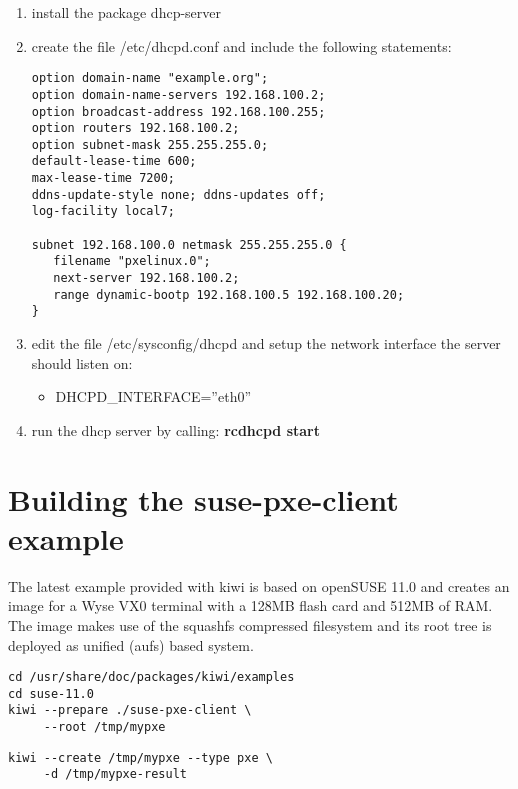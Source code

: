 \begin{enumerate}
\item install the package dhcp-server
\item create the file /etc/dhcpd.conf and include the following
      statements:
 
      \begin{verbatim}
option domain-name "example.org";
option domain-name-servers 192.168.100.2;
option broadcast-address 192.168.100.255;
option routers 192.168.100.2;
option subnet-mask 255.255.255.0;
default-lease-time 600;
max-lease-time 7200;
ddns-update-style none; ddns-updates off;
log-facility local7;

subnet 192.168.100.0 netmask 255.255.255.0 {
   filename "pxelinux.0";
   next-server 192.168.100.2;
   range dynamic-bootp 192.168.100.5 192.168.100.20;
}
\end{verbatim}

\item edit the file /etc/sysconfig/dhcpd and setup the network
      interface the server should listen on:
      \begin{itemize}
      \item DHCPD\_INTERFACE=''eth0''
      \end{itemize}
\item run the dhcp server by calling:
      \textbf{rcdhcpd start}
\end{enumerate}

\section{Building the suse-pxe-client example}

The latest example provided with kiwi is based on openSUSE 11.0 and creates an
image for a Wyse VX0 terminal with a 128MB flash card and 512MB of RAM.
The image makes use of the squashfs compressed filesystem and its
root tree is deployed as unified (aufs) based system. 

\begin{Command}{12cm}
\begin{verbatim}
cd /usr/share/doc/packages/kiwi/examples
cd suse-11.0
kiwi --prepare ./suse-pxe-client \
     --root /tmp/mypxe
\end{verbatim}
\end{Command}

\begin{Command}{12cm}
\begin{verbatim}
kiwi --create /tmp/mypxe --type pxe \
     -d /tmp/mypxe-result
\end{verbatim}
\end{Command}

